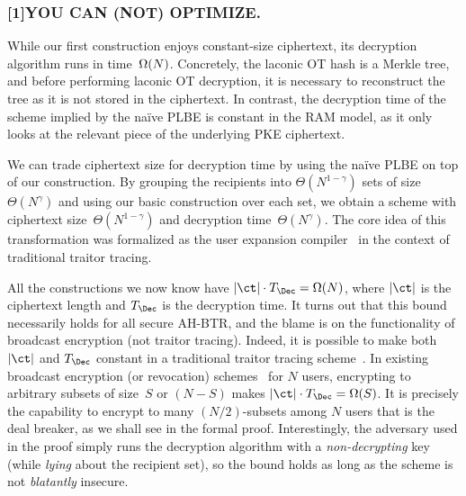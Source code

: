 \subsubsection{\scalebox{0.8}[1]{{\bfseries\selectfont YOU CAN (NOT) OPTIMIZE\@.}}}
While our first construction enjoys constant-size ciphertext,
its decryption algorithm runs in time~$\operatorname{\Omega}(N)$.
Concretely, the laconic OT hash is a Merkle tree, and before performing laconic OT decryption, it is necessary to reconstruct the tree as it is not stored in the ciphertext.
In contrast, the decryption time of the scheme implied by the na{\"i}ve PLBE is constant in the RAM model, as it only looks at the relevant piece of the underlying PKE ciphertext.

We can trade ciphertext size for decryption time by using the na{\"i}ve PLBE on top of our construction.
By grouping the recipients into $\Theta(N^{1-\gamma})$ sets of size~$\Theta(N^\gamma)$ and using our basic construction over each set, we obtain a scheme with ciphertext size~$\Theta(N^{1-\gamma})$ and decryption time~$\Theta(N^\gamma)$.
The core idea of this transformation was formalized as the user expansion compiler~\cite{C:Zhandry20} in the context of traditional traitor tracing.

All the constructions we now know have ${|\ct|\cdot T_\Dec=\bigOmega(N)}$,
where $|\ct|$ is the ciphertext length and $T_\Dec$ is the decryption time.
It turns out that this bound necessarily holds for all secure AH-BTR, and
the blame is on the functionality of broadcast encryption (not traitor tracing).
Indeed, 
it is possible to make both $|\ct|$ and $T_\Dec$ constant in a traditional traitor tracing scheme~\cite{C:BonZha14}.
In existing broadcast encryption (or revocation) schemes~\cite{C:BonGenWat05,AC:Delerablee07,EC:GenWat09,C:BonZha14,EC:AgrYam20,TCC:AgrWicYam20,EPRINT:BraVai20} for $N$ users,
encrypting to arbitrary subsets of size~$S$ or $({N-S})$ makes ${|\ct|\cdot T_\Dec=\Omega(S)}$.
It is precisely the capability to encrypt to many ${(N/2)}$-subsets among $N$ users that is the deal breaker, as we shall see in the formal proof.
Interestingly,
the adversary used in the proof
simply runs the decryption algorithm with a \emph{non-decrypting} key
(while \emph{lying} about the recipient set),
so the bound holds as long as the scheme is not \emph{blatantly} insecure.

